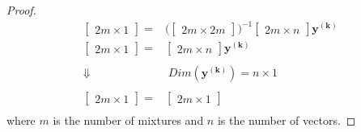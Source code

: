 \begin{proof}
\begin{equation*}
\begin{split}
	\begin{bmatrix}
		2m \times 1
	\end{bmatrix}
	= &
	\biggl(\begin{bmatrix}
		2m \times  2m
	\end{bmatrix} \biggr)^{-1} 
	\begin{bmatrix}
		2m \times n 
	\end{bmatrix} \mathbf{y^{(k)}} \\ 	%
	\begin{bmatrix}
		2m \times 1
	\end{bmatrix}
	= &
	\begin{bmatrix}
		2m \times n 
	\end{bmatrix} \mathbf{y^{(k)}} \\ 	%
	& \\
	\Downarrow & \; Dim(\mathbf{y^{(k)}}) = n \times 1 \\ %
	& \\
	\begin{bmatrix}
		2m \times 1
	\end{bmatrix}
	= &
	\begin{bmatrix}
		2m \times 1 
	\end{bmatrix} \\ 					%
	\end{split}
\end{equation*}
where $m$ is the number of mixtures and $n$ is the number of vectors.
\end{proof}
